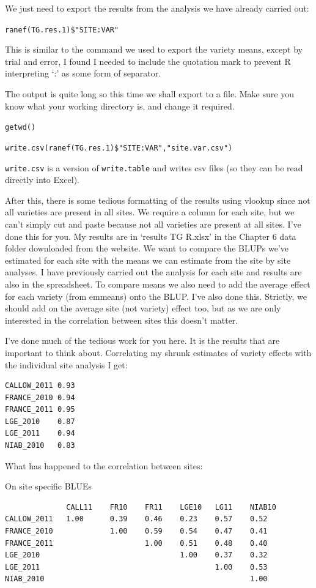 \documentclass[
]{book}
\begin{document}
We just need to export the results from the analysis we have already carried out:

\texttt{ranef(TG.res.1)\$"SITE:VAR"}

This is similar to the command we used to export the variety means, except by trial and error, I found I needed to include the quotation mark to prevent R interpreting `:' as some form of separator.

The output is quite long so this time we shall export to a file. Make sure you know what your working directory is, and change it required.

\texttt{getwd()}

\texttt{write.csv(ranef(TG.res.1)\$"SITE:VAR","site.var.csv")}

\texttt{write.csv} is a version of \texttt{write.table} and writes csv files (so they can be read directly into Excel).

After this, there is some tedious formatting of the results using vlookup since not all varieties are present in all sites. We require a column for each site, but we can't simply cut and paste because not all varieties are present at all sites. I've done this for you. My results are in `results TG R.xlsx' in the Chapter 6 data folder downloaded from the website. We want to compare the BLUPs we've estimated for each site with the means we can estimate from the site by site analyses. I have previously carried out the analysis for each site and results are also in the spreadsheet. To compare means we also need to add the average effect for each variety (from emmeans) onto the BLUP. I've also done this. Strictly, we should add on the average site (not variety) effect too, but as we are only interested in the correlation between sites this doesn't matter.

I've done much of the tedious work for you here. It is the results that are important to think about. Correlating my shrunk estimates of variety effects with the individual site analysis I get:

\begin{verbatim}
CALLOW_2011 0.93
FRANCE_2010 0.94
FRANCE_2011 0.95
LGE_2010    0.87
LGE_2011    0.94
NIAB_2010   0.83
\end{verbatim}

What has happened to the correlation between sites:

On site specific BLUEs

\begin{verbatim}
              CALL11    FR10    FR11    LGE10   LG11    NIAB10
CALLOW_2011   1.00      0.39    0.46    0.23    0.57    0.52
FRANCE_2010             1.00    0.59    0.54    0.47    0.41
FRANCE_2011                     1.00    0.51    0.48    0.40
LGE_2010                                1.00    0.37    0.32
LGE_2011                                        1.00    0.53
NIAB_2010                                               1.00
\end{verbatim}
\end{document}
